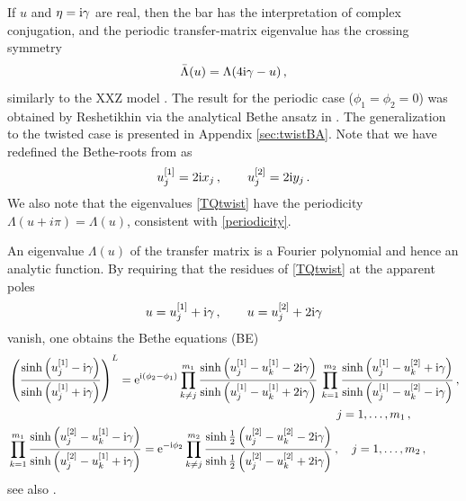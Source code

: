 \documentclass[12pt]{article}
\numberwithin{equation}{section}
\newcommand{\BR}[2]{u^{[#1]}_{#2}}
\newcommand{\ri}{{\rm i}}
\newcommand{\re}{{\rm e}}
\begin{document}
If $u$ and $\eta=\ri \gamma$ are real, then the bar has the interpretation of complex conjugation, and the periodic transfer-matrix eigenvalue has the crossing symmetry
\begin{equation}
    \bar{\Lambda}(u) = \Lambda(4\ri \gamma-u) \,,
\end{equation}
similarly to the XXZ model \cite{Resh83}.
The result for the periodic case ($\phi_1=\phi_2=0$) was obtained by Reshetikhin  via the analytical Bethe ansatz in \cite{Resh87}. The generalization to the twisted case is presented in Appendix \ref{sec:twistBA}.
Note that we have redefined the Bethe-roots from \cite{Resh87} as
\begin{align}
    u^{[1]}_j=2\ri x_j \,, \qquad u^{[2]}_j=2\ri y_j \,.
\end{align}
We also note that the eigenvalues \eqref{TQtwist} have the periodicity $\Lambda(u+i\pi) = \Lambda(u)$, consistent with \eqref{periodicity}.

An eigenvalue $\Lambda(u)$ of the transfer matrix is a Fourier polynomial and hence an analytic function. By requiring that the residues of \eqref{TQtwist} at the apparent poles
\begin{equation}
  u= \BR{1}{j}+\ri \gamma\,, \qquad
  u= \BR{2}{j}+2\ri \gamma
\end{equation}
vanish, one obtains the Bethe equations (BE) 
\begin{equation}
    \begin{aligned}\label{Twisted_BAE}
    &\left( \frac{\sinh\left(\BR{1}{j}-\ri \gamma\right)}{\sinh\left(\BR{1}{j}+\ri \gamma\right)} \right)^L
    = \re^{\ri(\phi_2 - \phi_1)}\prod_{k\neq j}^{m_1} \frac{\sinh\left(\BR{1}{j}-\BR{1}{k}-2\ri \gamma\right)}{\sinh\left(\BR{1}{j}-\BR{1}{k}+2\ri \gamma\right)}\,
      \prod_{k=1}^{m_2} \frac{\sinh\left(\BR{1}{j}-\BR{2}{k}+\ri \gamma\right)}{\sinh\left(\BR{1}{j}-\BR{2}{k}-\ri \gamma\right)}\,,  \\
  & \qquad\qquad\qquad\qquad\qquad\qquad\qquad\qquad\qquad\qquad\qquad\qquad\qquad\qquad j=1,\dots,m_1\,,\\
    &\prod_{k=1}^{m_1} \frac{\sinh\left(\BR{2}{j}-\BR{1}{k}-\ri \gamma\right)}{\sinh\left(\BR{2}{j}-\BR{1}{k}+\ri \gamma\right)}
    = \re^{-\ri \phi_2}\prod_{k\neq j}^{m_2} \frac{\sinh\frac12\left(\BR{2}{j}-\BR{2}{k}-2\ri \gamma\right)}{\sinh\frac12\left(\BR{2}{j}-\BR{2}{k}+2\ri \gamma\right)}\,,
    \quad j=1,\dots,m_2\,,
    \end{aligned}
\end{equation}
see also \cite{Resh87,VeLo91a}.
\end{document}
